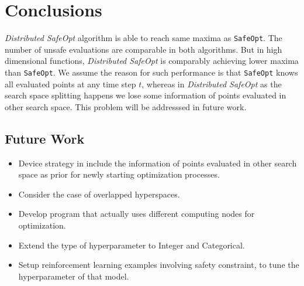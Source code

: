 \chapter{Conclusions}
\label{ch:conclusions}

\textit{Distributed SafeOpt} algorithm is able to reach same maxima as \texttt{SafeOpt}. The number of unsafe evaluations are comparable in both algorithms.
But in high dimensional functions, \textit{Distributed SafeOpt} is comparably achieving lower maxima than \texttt{SafeOpt}. 
We assume the reason for such performance is that \texttt{SafeOpt} knows all evaluated points at any time step $t$, whereas in \textit{Distributed SafeOpt} as the search space splitting happens we lose some information of points evaluated in other search space.
This problem will be addresssed in future work.

\section{Future Work}
\begin{itemize}
	\item Device strategy in include the information of points evaluated in other search space as prior for newly starting optimization processes.
	\item Consider the case of overlapped hyperspaces.
	\item Develop program that actually uses different computing nodes for optimization.
	\item Extend the type of hyperparameter to Integer and Categorical. 
	\item Setup reinforcement learning examples involving safety constraint, to tune the hyperparameter of that model.
\end{itemize}